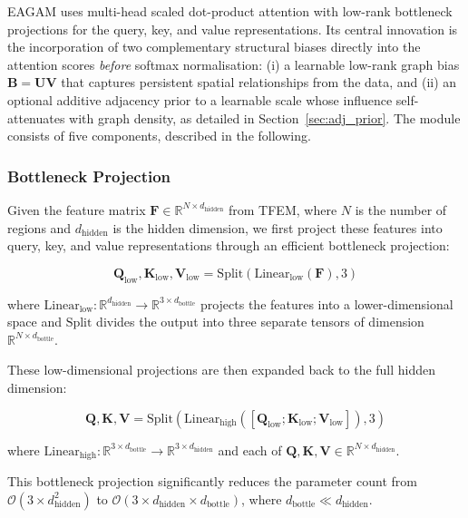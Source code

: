 \documentclass[final,1p,times]{elsarticle}
\begin{document}
EAGAM uses multi-head scaled dot-product attention with low-rank bottleneck projections for the query, key, and value representations. Its central innovation is the incorporation of two complementary structural biases directly into the attention scores \emph{before} softmax normalisation: (i) a learnable low-rank graph bias $\mathbf{B} = \mathbf{UV}$ that captures persistent spatial relationships from the data, and (ii) an optional additive adjacency prior to a learnable scale whose influence self-attenuates with graph density, as detailed in Section~\ref{sec:adj_prior}. The module consists of five components, described in the following.


\subsubsection{Bottleneck Projection}

Given the feature matrix $\mathbf{F} \in \mathbb{R}^{N \times d_{\text{hidden}}}$ from TFEM, where $N$ is the number of regions and $d_{\text{hidden}}$ is the hidden dimension, we first project these features into query, key, and value representations through an efficient bottleneck projection:

\begin{equation}
\mathbf{Q}_{\text{low}}, \mathbf{K}_{\text{low}}, \mathbf{V}_{\text{low}} = \text{Split}(\text{Linear}_{\text{low}}(\mathbf{F}), 3)
\end{equation}

where $\text{Linear}_{\text{low}}: \mathbb{R}^{d_{\text{hidden}}} \rightarrow \mathbb{R}^{3 \times d_{\text{bottle}}}$ projects the features into a lower-dimensional space and $\text{Split}$ divides the output into three separate tensors of dimension $\mathbb{R}^{N \times d_{\text{bottle}}}$.

These low-dimensional projections are then expanded back to the full hidden dimension:

\begin{equation}
\mathbf{Q}, \mathbf{K}, \mathbf{V} = \text{Split}(\text{Linear}_{\text{high}}([\mathbf{Q}_{\text{low}}; \mathbf{K}_{\text{low}}; \mathbf{V}_{\text{low}}]), 3)
\end{equation}

where $\text{Linear}_{\text{high}}: \mathbb{R}^{3 \times d_{\text{bottle}}} \rightarrow \mathbb{R}^{3 \times d_{\text{hidden}}}$ and each of $\mathbf{Q}, \mathbf{K}, \mathbf{V} \in \mathbb{R}^{N \times d_{\text{hidden}}}$.

This bottleneck projection significantly reduces the parameter count from $\mathcal{O}(3 \times d_{\text{hidden}}^2)$ to $\mathcal{O}(3 \times d_{\text{hidden}} \times d_{\text{bottle}})$, where $d_{\text{bottle}} \ll d_{\text{hidden}}$.
\end{document}
